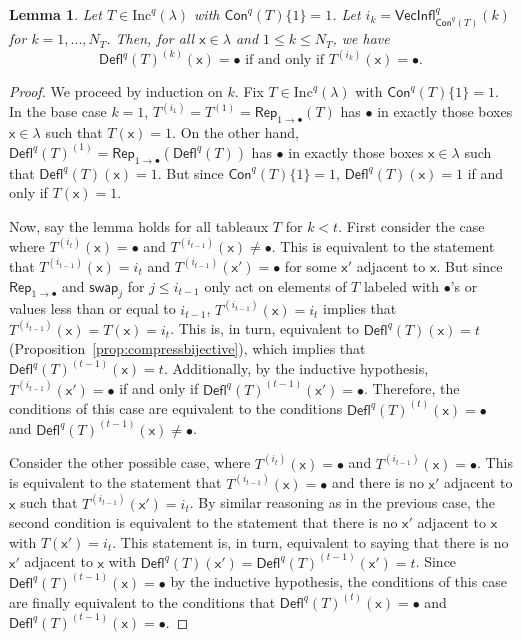 \documentclass[12pt]{amsart}
\newcommand{\x}{\ensuremath{\mathsf{x}}}
\newtheorem{lemma}[theorem]{Lemma}
\theoremstyle{definition}
\theoremstyle{remark}
\numberwithin{equation}{section}
\newcommand{\inc}{\ensuremath{\mathrm{Inc}}}
\newcommand{\swap}{\ensuremath{\mathsf{swap}}}
\newcommand{\rep}{\ensuremath{\mathsf{Rep}}}
\newcommand{\deflate}{\ensuremath{\mathsf{Defl}}}
\newcommand{\inflate}{\ensuremath{\mathsf{VecInfl}}}
\newcommand{\content}{\ensuremath{\mathsf{Con}}}
\begin{document}
\begin{lemma} \label{lem:bullet_placement}
Let $T \in \inc^q(\lambda)$ with $\content^q(T) \lbrace 1 \rbrace = 1$. Let $i_k = \inflate^q_{\content^q(T)}(k)$ for $k = 1,...,N_T$. Then, for all $\x \in \lambda$ and $1 \leq k \leq N_T$, we have
 \begin{equation}\label{eq:gappy_promotion2}
\deflate^q(T)^{(k)}(\x) = \bullet \text{ if and only if } T^{(i_k)}(\x) = \bullet.
\end{equation}
\end{lemma}
\begin{proof} We proceed by induction on $k$. Fix $T \in \inc^q(\lambda)$  with $\content^q(T) \lbrace 1 \rbrace = 1$. In the base case $k = 1$,  $T^{(i_1)} = T^{(1)} = \rep_{1 \rightarrow \bullet}(T)$ has $\bullet$ in exactly those boxes $\x \in \lambda$ such that $T(\x) = 1$. On the other hand, $\deflate^q(T)^{(1)} =  \rep_{1 \rightarrow \bullet}(\deflate^q(T))$ has $\bullet$ in exactly those boxes $\x \in \lambda$ such that $\deflate^q(T)(\x) = 1$. But since $\content^q(T) \lbrace 1 \rbrace = 1$, $\deflate^q(T)(\x) = 1$ if and only if $T(\x) = 1$. 


Now, say the lemma holds for all tableaux $T$ for $k < t$. First consider the case where $T^{(i_t)}(\x) = \bullet$ and $T^{(i_{t-1})}(\x) \neq \bullet$. This is equivalent to the statement that $T^{(i_{t-1})}(\x) = i_t$ and $T^{(i_{t-1})}(\x') = \bullet$ for some $\x'$ adjacent to $\x$. But since $\rep_{1 \rightarrow \bullet}$ and $\swap_j$ for  $j \leq i_{t-1}$ only act on elements of $T$ labeled with $\bullet$'s or values less than or equal to $i_{t-1}$, $T^{(i_{t-1})}(\x) = i_t$ implies that $T^{(i_{t-1})}(\x) = T(\x) = i_t$. This is, in turn, equivalent to $\deflate^q(T)(\x) = t$ (Proposition~\ref{prop:compressbijective}), which implies that $\deflate^q(T)^{(t-1)}(\x) = t$. Additionally, by the inductive hypothesis, $T^{(i_{t-1})}(\x') = \bullet$ if and only if $\deflate^q(T)^{(t-1)}(\x') = \bullet$. Therefore, the conditions of this case are equivalent to the conditions $\deflate^q(T)^{(t)}(\x) = \bullet$ and $\deflate^q(T)^{(t-1)}(\x) \neq \bullet$. 

Consider the other possible case, where $T^{(i_t)}(\x) = \bullet$ and $T^{(i_{t-1})}(\x) = \bullet$. This is equivalent to the statement that $T^{(i_{t-1})}(\x) = \bullet$ and there is no $\x'$ adjacent to $\x$ such that $T^{(i_{t-1})}(\x') = i_t$. By similar reasoning as in the previous case, the second condition is equivalent to the statement that there is no $\x'$ adjacent to $\x$ with $T(\x') = i_t$. This statement is, in turn, equivalent to saying that there is no $\x'$ adjacent to $\x$ with $\deflate^q(T)(\x') = \deflate^q(T)^{(t-1)}(\x') = t$. Since $\deflate^q(T)^{(t-1)}(\x) = \bullet$ by the inductive hypothesis, the conditions of this case are finally equivalent to the conditions that $\deflate^q(T)^{(t)}(\x) = \bullet$ and $\deflate^q(T)^{(t-1)}(\x) = \bullet$.
\end{proof}
\end{document}
